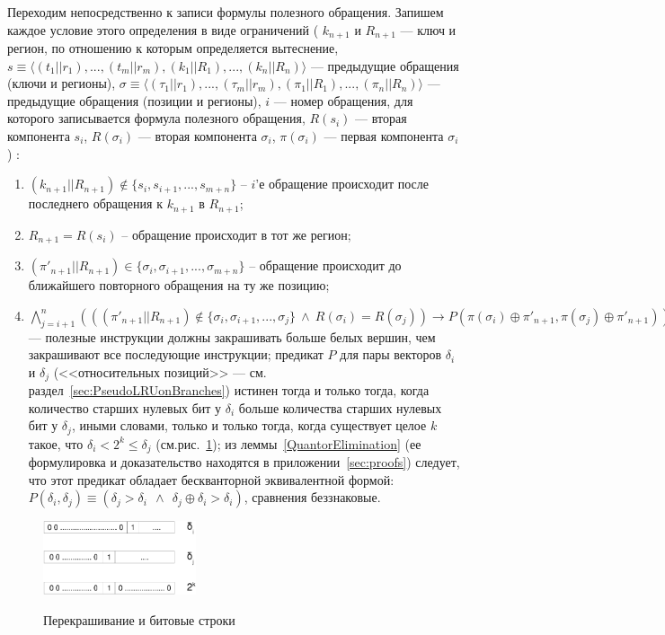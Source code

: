 Переходим непосредственно к записи формулы полезного обращения. Запишем каждое условие этого определения в виде ограничений ( $k_{n+1}$ и $R_{n+1}$ --- ключ и регион, по отношению к которым определяется вытеснение, $s \equiv \langle (t_1||r_1), ..., (t_m||r_m), (k_1||R_1), ..., (k_n||R_n)\rangle$ --- предыдущие обращения (ключи и регионы), $\sigma \equiv \langle (\tau_1||r_1), ..., (\tau_m||r_m), (\pi_1||R_1), ..., (\pi_n||R_n)\rangle$ --- предыдущие обращения (позиции и регионы), $i$ --- номер обращения, для которого записывается формула полезного обращения, $R(s_i)$ --- вторая компонента $s_i$, $R(\sigma_i)$ --- вторая компонента $\sigma_i$, $\pi(\sigma_i)$ --- первая компонента $\sigma_i$) :
\begin{enumerate}
    \item $(k_{n+1}||R_{n+1}) \notin \{s_i, s_{i+1}, ...,  s_{m+n}\}$ -- $i$'е обращение происходит после последнего обращения к $k_{n+1}$ в $R_{n+1}$;
    \item $R_{n+1} = R(s_i)$ -- обращение происходит в тот же регион;
    \item $(\pi'_{n+1}||R_{n+1}) \in \{\sigma_i, \sigma_{i+1}, ..., \sigma_{m+n}\}$ -- обращение происходит до ближайшего повторного обращения на ту же позицию;
    \item $\bigwedge\limits_{j = i+1}^n (((\pi'_{n+1}||R_{n+1}) \notin \{\sigma_i, \sigma_{i+1}, ..., \sigma_j\}~\wedge~R(\sigma_i) = R(\sigma_j)) \rightarrow P(\pi(\sigma_i) \oplus \pi'_{n+1}, \pi(\sigma_j) \oplus \pi'_{n+1}))$ --- полезные инструкции должны закрашивать больше белых вершин, чем закрашивают все последующие инструкции;  предикат $P$ для пары векторов $\delta_i$ и $\delta_j$ (<<относительных позиций>> --- см. раздел~\ref{sec:PseudoLRUonBranches}) истинен тогда и только тогда, когда количество старших нулевых бит у $\delta_i$ больше количества старших нулевых бит у $\delta_j$, иными словами, только и только тогда, когда существует целое $k$ такое, что $\delta_i < 2^k \leqslant \delta_j$ (см.рис.~\ref{fig:bits}); из леммы~\ref{QuantorElimination} (ее формулировка и доказательство находятся в приложении~\ref{sec:proofs}) следует, что этот предикат обладает бескванторной эквивалентной формой: $P(\delta_i, \delta_j) \equiv (\delta_j > \delta_i~~\wedge~~\delta_j \oplus \delta_i > \delta_i)$, сравнения беззнаковые.
\end{enumerate}

\begin{figure}[h] \center
  \includegraphics[width=0.4\textwidth]{2.theor/bits}\\
  \caption{Перекрашивание и битовые строки}\label{fig:bits}
\end{figure}


